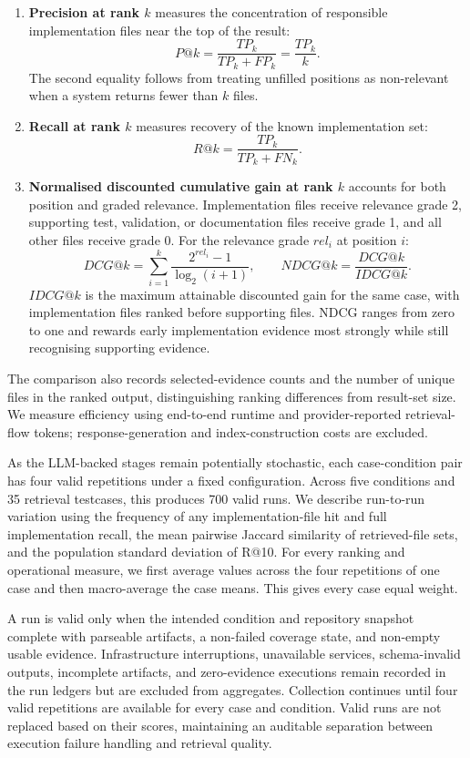 \begin{enumerate}
\item \textbf{Precision at rank $k$} measures the concentration of responsible implementation files near the top of the result:
\[
P@k = \frac{TP_k}{TP_k + FP_k} = \frac{TP_k}{k}.
\]
The second equality follows from treating unfilled positions as non-relevant when a system returns fewer than $k$ files.

\item \textbf{Recall at rank $k$} measures recovery of the known implementation set:
\[
R@k = \frac{TP_k}{TP_k + FN_k}.
\]
\item \textbf{Normalised discounted cumulative gain at rank $k$} accounts for both position and graded relevance. Implementation files receive relevance grade 2, supporting test, validation, or documentation files receive grade 1, and all other files receive grade 0. For the relevance grade $rel_i$ at position $i$:
\[
DCG@k = \sum_{i=1}^{k} \frac{2^{rel_i}-1}{\log_2(i+1)},
\qquad
NDCG@k = \frac{DCG@k}{IDCG@k}.
\]
$IDCG@k$ is the maximum attainable discounted gain for the same case, with implementation files ranked before supporting files. NDCG ranges from zero to one and rewards early implementation evidence most strongly while still recognising supporting evidence.

\end{enumerate}

The comparison also records selected-evidence counts and the number of unique files in the ranked output, distinguishing ranking differences from result-set size. We measure efficiency using end-to-end runtime and provider-reported retrieval-flow tokens; response-generation and index-construction costs are excluded.

As the LLM-backed stages remain potentially stochastic, each case-condition pair has four valid repetitions under a fixed configuration. Across five conditions and 35 retrieval testcases, this produces 700 valid runs. We describe run-to-run variation using the frequency of any implementation-file hit and full implementation recall, the mean pairwise Jaccard similarity of retrieved-file sets, and the population standard deviation of R@10. For every ranking and operational measure, we first average values across the four repetitions of one case and then macro-average the case means. This gives every case equal weight.

A run is valid only when the intended condition and repository snapshot complete with parseable artifacts, a non-failed coverage state, and non-empty usable evidence. Infrastructure interruptions, unavailable services, schema-invalid outputs, incomplete artifacts, and zero-evidence executions remain recorded in the run ledgers but are excluded from aggregates. Collection continues until four valid repetitions are available for every case and condition. Valid runs are not replaced based on their scores, maintaining an auditable separation between execution failure handling and retrieval quality.

